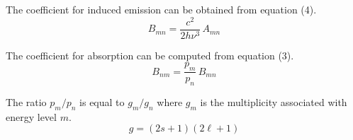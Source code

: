 \documentclass[12pt]{article}
\newcommand\BNM{B_{nm}} %
\newcommand\BMN{B_{mn}} %
\newcommand\AMN{A_{mn}} %
\begin{document}
\noindent
The coefficient for induced emission can be obtained from equation (4).
\begin{equation*}
\BMN=\frac{c^2}{2h\nu^3}\,\AMN
\end{equation*}

\noindent
The coefficient for absorption can be computed from equation (3).
\begin{equation*}
\BNM=\frac{p_m}{p_n}\,\BMN
\end{equation*}

\noindent
The ratio $p_m/p_n$ is equal to $g_m/g_n$ where $g_m$ is the multiplicity
associated with energy level $m$.
\begin{equation*}
g=(2s+1)(2\ell+1)
\end{equation*}
\end{document}
